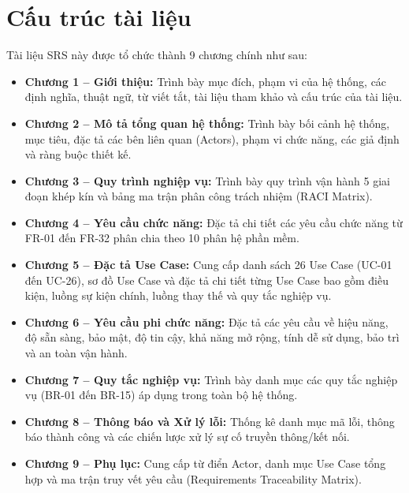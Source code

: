 \section{Cấu trúc tài liệu}
Tài liệu SRS này được tổ chức thành 9 chương chính như sau:
\begin{itemize}
    \item \textbf{Chương 1 – Giới thiệu:} Trình bày mục đích, phạm vi của hệ thống, các định nghĩa, thuật ngữ, từ viết tắt, tài liệu tham khảo và cấu trúc của tài liệu.
    \item \textbf{Chương 2 – Mô tả tổng quan hệ thống:} Trình bày bối cảnh hệ thống, mục tiêu, đặc tả các bên liên quan (Actors), phạm vi chức năng, các giả định và ràng buộc thiết kế.
    \item \textbf{Chương 3 – Quy trình nghiệp vụ:} Trình bày quy trình vận hành 5 giai đoạn khép kín và bảng ma trận phân công trách nhiệm (RACI Matrix).
    \item \textbf{Chương 4 – Yêu cầu chức năng:} Đặc tả chi tiết các yêu cầu chức năng từ FR-01 đến FR-32 phân chia theo 10 phân hệ phần mềm.
    \item \textbf{Chương 5 – Đặc tả Use Case:} Cung cấp danh sách 26 Use Case (UC-01 đến UC-26), sơ đồ Use Case và đặc tả chi tiết từng Use Case bao gồm điều kiện, luồng sự kiện chính, luồng thay thế và quy tắc nghiệp vụ.
    \item \textbf{Chương 6 – Yêu cầu phi chức năng:} Đặc tả các yêu cầu về hiệu năng, độ sẵn sàng, bảo mật, độ tin cậy, khả năng mở rộng, tính dễ sử dụng, bảo trì và an toàn vận hành.
    \item \textbf{Chương 7 – Quy tắc nghiệp vụ:} Trình bày danh mục các quy tắc nghiệp vụ (BR-01 đến BR-15) áp dụng trong toàn bộ hệ thống.
    \item \textbf{Chương 8 – Thông báo và Xử lý lỗi:} Thống kê danh mục mã lỗi, thông báo thành công và các chiến lược xử lý sự cố truyền thông/kết nối.
    \item \textbf{Chương 9 – Phụ lục:} Cung cấp từ điển Actor, danh mục Use Case tổng hợp và ma trận truy vết yêu cầu (Requirements Traceability Matrix).
\end{itemize}

